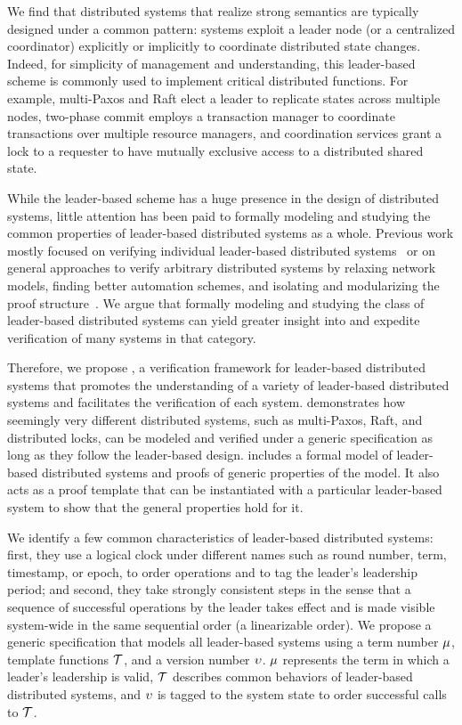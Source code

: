 {We find that distributed systems that realize strong semantics are typically
designed under a common pattern: systems exploit a leader node
(or a centralized coordinator) explicitly or implicitly to coordinate
distributed state changes. Indeed, for simplicity of management and understanding,
this leader-based scheme is commonly used to implement critical distributed
functions. For example, multi-Paxos and Raft elect a leader to replicate states
across multiple nodes, two-phase commit employs a transaction manager to
coordinate transactions over multiple resource managers, and coordination
services grant a lock to a requester to have mutually exclusive access to a
distributed shared state.

While the leader-based scheme has a huge presence in the design of distributed systems,
little attention has been paid to formally modeling and studying the common properties
of leader-based distributed systems as a whole. Previous work mostly focused
on verifying individual leader-based distributed systems~\cite{ironfleet, cppraft}
or on general approaches to verify arbitrary distributed systems by relaxing network
models, finding better automation schemes, and isolating and modularizing the
proof structure~\cite{verdi, disel, modular}. We argue that formally
modeling and studying the class of leader-based distributed systems can yield greater
insight into and expedite verification of many systems in that category.


Therefore, we propose \sysname{}, a verification framework for
leader-based distributed systems that promotes the understanding of
a variety of leader-based distributed systems and facilitates the verification
of each system. \sysname{} demonstrates how seemingly very different distributed systems,
such as multi-Paxos, Raft, and distributed locks, can be modeled and verified under
a generic specification as long as they follow the leader-based design.
\sysname{} includes a formal model of leader-based distributed systems and
proofs of generic properties of the model.
It also acts as a proof template that can be instantiated with a particular leader-based
system to show that the general properties hold for it.



We identify a few common characteristics of leader-based distributed systems:
first, they use a logical clock under different names such as round number,
term, timestamp, or epoch, to order operations and to tag the leader's
leadership period;
and second, they take strongly consistent steps in the sense that a
sequence of successful operations by the leader takes effect and is made visible
system-wide in the same sequential order (a linearizable order).
We propose a generic specification that models all leader-based systems using a
term number $\mu$, template functions $\mathcal{T}$, and
a version number $\upsilon$. $\mu$ represents the term in which a leader's leadership is valid,
$\mathcal{T}$ describes common behaviors of leader-based distributed systems,
and $\upsilon$ is tagged to the system state to order successful calls to $\mathcal{T}$.


}
